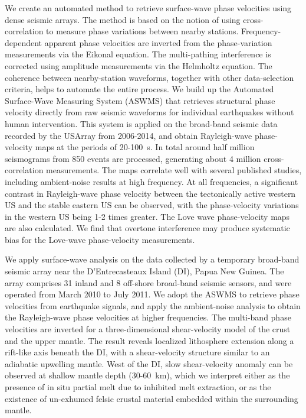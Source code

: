 We create an automated method to retrieve surface-wave phase velocities using dense seismic arrays. The method is based on the notion of using cross-correlation to measure phase variations between nearby stations. Frequency-dependent apparent phase velocities are inverted from the phase-variation measurements via the Eikonal equation. The multi-pathing interference is corrected using amplitude measurements via the Helmholtz equation. The coherence between nearby-station waveforms, together with other data-selection criteria, helps to automate the entire process. We build up the Automated Surface-Wave Measuring System (ASWMS) that retrieves structural phase velocity directly from raw seismic waveforms for individual earthquakes without human intervention. 
This system is applied on the broad-band seismic data recorded by the USArray from 2006-2014, and obtain Rayleigh-wave phase-velocity maps at the periods of 20-100~s. 
In total around half million seismograms from 850 events are processed, generating about 4 million cross-correlation measurements.
The maps correlate well with several published studies, including ambient-noise results at high frequency. At all frequencies, a significant contrast in Rayleigh-wave phase velocity between the tectonically active western US and the stable eastern US can be observed, with the phase-velocity variations in the western US being 1-2 times greater.
The Love wave phase-velocity maps are also calculated. We find that overtone interference may produce systematic bias for the Love-wave phase-velocity measurements.

We apply surface-wave analysis on the data collected by a temporary broad-band seismic array near the D'Entrecasteaux Island (DI), Papua New Guinea. The array comprises 31 inland and 8 off-shore broad-band seismic sensors, and were operated from March 2010 to July 2011. 
We adopt the ASWMS to retrieve phase velocities from earthquake signals, and apply the ambient-noise analysis to obtain the Rayleigh-wave phase velocities at higher frequencies. The multi-band phase velocities are inverted for a three-dimensional shear-velocity model of the crust and the upper mantle. The result reveals localized lithosphere extension along a rift-like axis beneath the DI, with a shear-velocity structure similar to an adiabatic upwelling mantle. West of the DI, slow shear-velocity anomaly can be observed at shallow mantle depth (30-60~km), which we interpret either as the presence of in situ partial melt due to inhibited melt extraction, or as the existence of un-exhumed felsic crustal material embedded  within the surrounding mantle.

